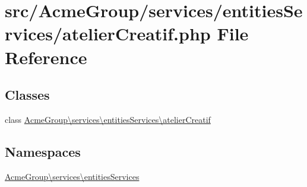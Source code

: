 \hypertarget{atelier_creatif_8php}{\section{src/\+Acme\+Group/services/entities\+Services/atelier\+Creatif.php File Reference}
\label{atelier_creatif_8php}
}
\subsection*{Classes}
\begin{DoxyCompactItemize}
\item 
class \hyperlink{class_acme_group_1_1services_1_1entities_services_1_1atelier_creatif}{Acme\+Group\textbackslash{}services\textbackslash{}entities\+Services\textbackslash{}atelier\+Creatif}
\end{DoxyCompactItemize}
\subsection*{Namespaces}
\begin{DoxyCompactItemize}
\item 
 \hyperlink{namespace_acme_group_1_1services_1_1entities_services}{Acme\+Group\textbackslash{}services\textbackslash{}entities\+Services}
\end{DoxyCompactItemize}
